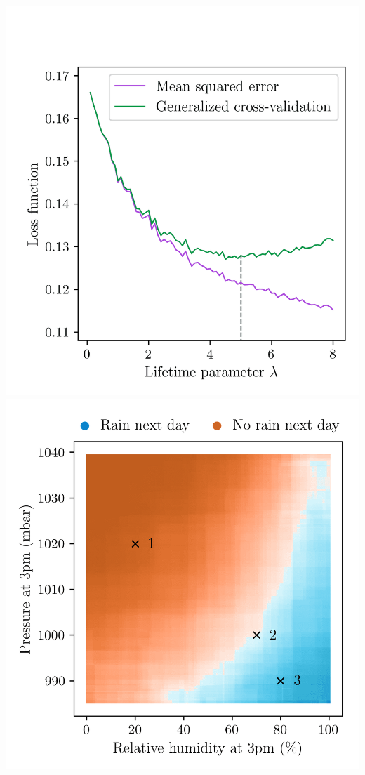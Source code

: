 \documentclass{article}
\begin{document}
\includegraphics[scale=0.5]{graphics/weather_gcv.png}
\includegraphics[scale=0.5]{graphics/weather_forest_design.png}
\end{document}
